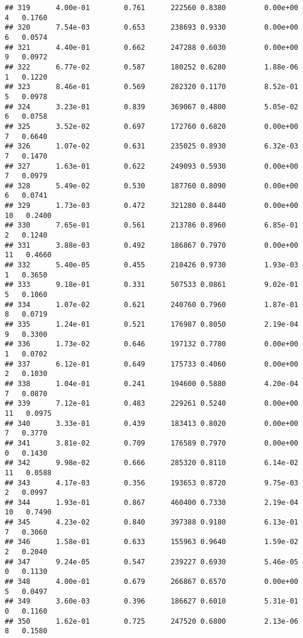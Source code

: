\documentclass[
]{article}
\begin{document}
\begin{verbatim}
## 319      4.00e-01        0.761      222560 0.8380         0.00e+00   4   0.1760
## 320      7.54e-03        0.653      238693 0.9330         0.00e+00   6   0.0574
## 321      4.40e-01        0.662      247288 0.6030         0.00e+00   9   0.0972
## 322      6.77e-02        0.587      180252 0.6280         1.88e-06   1   0.1220
## 323      8.46e-01        0.569      282320 0.1170         8.52e-01   5   0.0978
## 324      3.23e-01        0.839      369067 0.4800         5.05e-02   6   0.0758
## 325      3.52e-02        0.697      172760 0.6820         0.00e+00   7   0.6640
## 326      1.07e-02        0.631      235025 0.8930         6.32e-03   7   0.1470
## 327      1.63e-01        0.622      249093 0.5930         0.00e+00   7   0.0979
## 328      5.49e-02        0.530      187760 0.8090         0.00e+00   6   0.0741
## 329      1.73e-03        0.472      321280 0.8440         0.00e+00  10   0.2400
## 330      7.65e-01        0.561      213786 0.8960         6.85e-01   2   0.1240
## 331      3.88e-03        0.492      186867 0.7970         0.00e+00  11   0.4660
## 332      5.40e-05        0.455      210426 0.9730         1.93e-03   1   0.3650
## 333      9.18e-01        0.331      507533 0.0861         9.02e-01   5   0.1060
## 334      1.07e-02        0.621      240760 0.7960         1.87e-01   8   0.0719
## 335      1.24e-01        0.521      176987 0.8050         2.19e-04   9   0.3300
## 336      1.73e-02        0.646      197132 0.7780         0.00e+00   1   0.0702
## 337      6.12e-01        0.649      175733 0.4060         0.00e+00   2   0.1030
## 338      1.04e-01        0.241      194600 0.5880         4.20e-04   7   0.0870
## 339      7.12e-01        0.483      229261 0.5240         0.00e+00  11   0.0975
## 340      3.33e-01        0.439      183413 0.8020         0.00e+00   7   0.3770
## 341      3.81e-02        0.709      176589 0.7970         0.00e+00   0   0.1430
## 342      9.98e-02        0.666      285320 0.8110         6.14e-02  11   0.0588
## 343      4.17e-03        0.356      193653 0.8720         9.75e-03   2   0.0997
## 344      1.93e-01        0.867      460400 0.7330         2.19e-04  10   0.7490
## 345      4.23e-02        0.840      397388 0.9180         6.13e-01   7   0.3060
## 346      1.58e-01        0.633      155963 0.9640         1.59e-02   2   0.2040
## 347      9.24e-05        0.547      239227 0.6930         5.46e-05   0   0.1130
## 348      4.00e-01        0.679      266867 0.6570         0.00e+00   5   0.0497
## 349      3.60e-03        0.396      186627 0.6010         5.31e-01   0   0.1160
## 350      1.62e-01        0.725      247520 0.6800         2.13e-06   8   0.1580

\end{verbatim}
\end{document}
